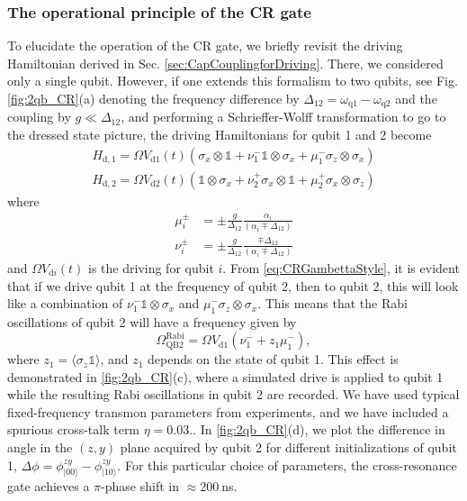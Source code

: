 \documentclass[aip,apr,twocolumn,showpacs,superscriptaddress,groupedaddress,nofootinbib,reprint]{revtex4-1}  %
\newcommand{\Id}{\mathds{1}}
\newcommand{\CR}{\textsf{CR}}
\renewcommand{\d}{\text{d}}
\begin{document}
\subsubsection{The operational principle of the \textsf{CR} gate}
To elucidate the operation of the \CR{} gate, we briefly revisit the driving Hamiltonian derived in Sec. \ref{sec:CapCouplingforDriving}. There, we considered only a single qubit. However, if one extends this formalism to two qubits, see Fig. \ref{fig:2qb_CR}(a) denoting the frequency difference by $\Delta_{12} = \omega_{\text{q}1} - \omega_{\text{q}2}$ and the coupling by $g\ll \Delta_{12}$, and performing a Schrieffer-Wolff transformation to go to the dressed state picture, the driving Hamiltonians for qubit 1 and 2 become\cite{Rigetti2010,Julich}
\begin{align}
H_{\d,1} = \Omega V_{\d1}(t)\left(\sigma_x\otimes\Id + \nu_1^-\Id\otimes\sigma_x + \mu_1^{-}\sigma_z\otimes\sigma_x\right)\label{eq:CRGambettaStyle}\\
H_{\d,2} = \Omega V_{\d2}(t)\left(\Id\otimes\sigma_x + \nu_2^+\sigma_x\otimes\Id + \mu_2^{+}\sigma_x\otimes\sigma_z\right)
\end{align}
where
\begin{align}
\mu_i^\pm &= \pm\frac{g}{\Delta_{12}}\frac{\alpha_i}{(\alpha_i \mp \Delta_{12})} \label{eq:muforCR1}\\
\nu_i^\pm &= \pm\frac{g}{\Delta_{12}}\frac{\mp \Delta_{12}}{(\alpha_i \mp \Delta_{12})}
\end{align}
and $\Omega V_{\text{d}i}(t)$ is the driving for qubit $i$. From \cref{eq:CRGambettaStyle}, it is evident that if we drive qubit 1 at the frequency of qubit 2, then to qubit 2, this will look like a combination of $\nu_1^-\Id\otimes\sigma_x$ and $\mu_1^-\sigma_z\otimes\sigma_x$. This means that the Rabi oscillations of qubit 2 will have a frequency given by
\begin{equation}
\Omega^\text{Rabi}_{\text{QB2}} = \Omega V_{\text{d}1}\left(\nu_1^- + z_1 \mu_1^-\right), \label{eq:CR_rabi}
\end{equation}
where $z_1=\langle\sigma_z \Id\rangle$, and $z_1$ depends on the state of qubit 1. This effect is demonstrated in \cref{fig:2qb_CR}(c), where a simulated drive is applied to qubit 1 while the resulting Rabi oscillations in qubit 2 are recorded. We have used typical fixed-frequency transmon parameters from experiments, and we have included a spurious cross-talk term $\eta = 0.03$.\cite{Chow2012,Corcoles2013}. In \cref{fig:2qb_CR}(d), we plot the difference in angle in the $(z,y)$ plane acquired by qubit 2 for different initializations of qubit 1, $\Delta \phi = \phi_{|00\rangle}^{zy} - \phi_{|10\rangle}^{zy}$. For this particular choice of parameters, the cross-resonance gate achieves a $\pi$-phase shift in $\approx 200~$ns.
\end{document}
